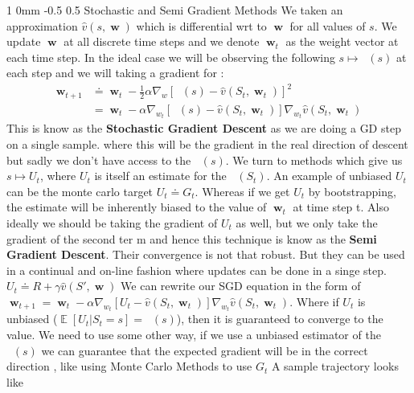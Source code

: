 \documentclass[twocolumn,11pt]{article}
\makeatletter
\DeclareMathOperator{\E}{\mathbb{E}}
\DeclareMathOperator{\w}{\textbf{w}}
\DeclareMathOperator{\vp}{v_\pi} %
\renewcommand{\subsection}{\@startsection
{subsection}%
{1}%
{0mm}%
{-0.5\baselineskip}%
{0.5\baselineskip}%
{\bfseries\color{blue}}} %
\makeatother
\begin{document}
\subsection{Stochastic and Semi Gradient Methods}
We  taken an approximation $\hat{v}(s, \w)$ which is differential wrt to $\w$ for all  values of $s$. We update $\w$ at all discrete time steps and we denote $\w_t $ as the weight vector at each time step. In the ideal case we will be observing the following $s \mapsto \vp(s)$ at each  step and  we will taking a gradient for :
\begin{align*}
\w_{t+1}  & \doteq \w_t - \tfrac{1}{2}\alpha \nabla_w \left[ \vp(s) - \hat{v}(S_t, \w_t) \right]^2 \\
& = \w_t - \alpha \nabla_{w_{t}} \left[ \vp(s) - \hat{v}(S_t, \w_t) \right] \nabla_{w_{t}}  \hat{v}(S_t, \w_t)
\end{align*}
This is know as the  \textbf{Stochastic Gradient Descent }as we are doing a GD  step on a single sample. 
where this will be the gradient  in the real direction of descent but sadly we don't have access to the  $\vp(s)$. We turn  to methods which give us $s \mapsto U_t$, where $U_t$ is itself an estimate for the $\vp(S_t)$.  An example of unbiased $U_t$ can be the monte carlo target $U_t \doteq G_t$. Whereas if we get  $U_t$ by bootstrapping, the estimate will be inherently biased to the value of  $\w_t$ at time step t. Also ideally we should be taking the gradient of $U_t$ as well, but we only take the gradient of  the second ter m and hence this technique is know as the \textbf{Semi Gradient Descent}. Their  convergence is not that robust. But they can be used in a continual and on-line fashion where updates can be done in a singe step. $U_t \doteq R + \gamma \hat{v}(S', \w)$
We can rewrite our SGD equation in the form of $\w_{t+1}= \w_t - \alpha \nabla_{w_{t}} \left[ U_t - \hat{v}(S_t, \w_t) \right] \nabla_{w_{t}}  \hat{v}(S_t, \w_t)$. Where if $U_t$ is unbiased ($\E[U_t | S_t = s] = \vp(s)$), then it is guaranteed to converge to the value. We need to use some other way, if we use a unbiased estimator of the $\vp(s)$ we can guarantee that the expected gradient will be in the correct direction , like using Monte Carlo Methods to use $G_t$
A sample trajectory looks like\\
\end{document}
